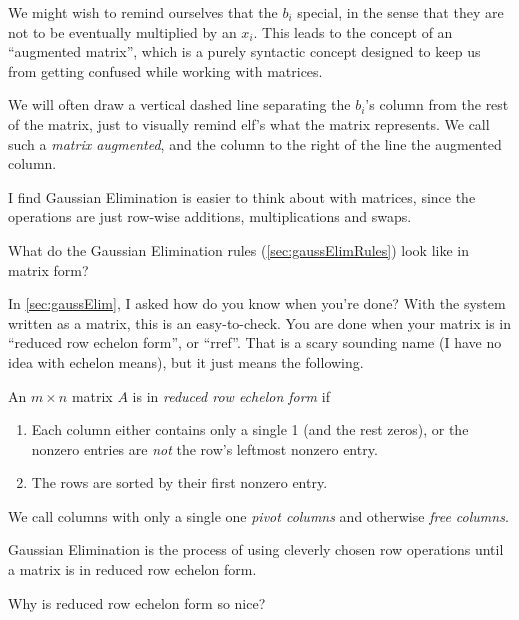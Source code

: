 \documentclass[Main.tex]{subfiles}
\begin{document}
We might wish to remind ourselves that the $b_i$ special, in the sense that they are not to be eventually multiplied by an $x_i$.  
This leads to the concept of an ``augmented matrix'', which is a purely syntactic concept designed to keep us from getting confused while working with matrices.  

\begin{Def}
  We will often draw a vertical dashed line separating the $b_i$'s column from the rest of the matrix, just to visually remind elf's what the matrix represents.  
  We call such a \emph{matrix augmented}, and the column to the right of the line the augmented column.  
\end{Def}

I find Gaussian Elimination is easier to think about with matrices, since the operations are just row-wise additions, multiplications and swaps.  
\begin{Ex}
  What do the Gaussian Elimination rules (\ref{sec:gaussElimRules}) look like in matrix form?  
\end{Ex}

In \ref{sec:gaussElim}, I asked how do you know when you're done?  
With the system written as a matrix, this is an easy-to-check.   
You are done when your matrix is in ``reduced row echelon form'', or ``rref''.  
That is a scary sounding name (I have no idea with echelon means), but it just means the following.
\begin{Def}
  An $m\times n$ matrix $A$ is in \emph{reduced row echelon form} if
  \begin{enumerate}
  \item Each column either contains only a single 1 (and the rest zeros), or the nonzero entries are \emph{not} the row's leftmost nonzero entry.
  \item The rows are sorted by their first nonzero entry.
  \end{enumerate}
  We call columns with only a single one \emph{pivot columns} and otherwise \emph{free columns}.  
\end{Def}

\begin{Def}
  Gaussian Elimination is the process of using cleverly chosen row operations until a matrix is in reduced row echelon form.  
\end{Def}

\noindent Why is reduced row echelon form so nice?  
\end{document}
